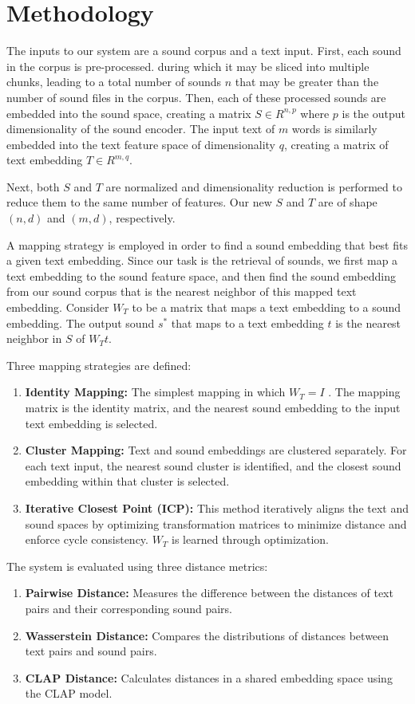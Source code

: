 \documentclass[twoside,a4paper]{article}
\begin{document}
\section{Methodology}\label{sec:methodology}
The inputs to our system are a sound corpus and a text input. First, each sound in the corpus is pre-processed. during which it may be sliced into multiple chunks, leading to a total number of sounds $n$ that may be greater than the number of sound files in the corpus. Then, each of these processed sounds are embedded into the sound space, creating a matrix $S \in R^{n, p}$ where $p$ is the output dimensionality of the sound encoder. The input text of $m$ words is similarly embedded into the text feature space of dimensionality $q$, creating a matrix of text embedding  $T \in R^{m,q}$.

Next, both $S$ and $T$ are normalized and dimensionality reduction is performed to reduce them to the same number of features. Our new $S$ and $T$ are of shape $(n, d)$ and $(m, d)$, respectively.

A mapping strategy is employed in order to find a sound embedding that best fits a given text embedding. Since our task is the retrieval of sounds, we first map a text embedding to the sound feature space, and then find the sound embedding from our sound corpus that is the nearest neighbor of this mapped text embedding. Consider $W_T$ to be a matrix that maps a text embedding to a sound embedding. The output sound $s^*$ that maps to a text embedding $t$ is the nearest neighbor in $S$ of $W_Tt$.

Three mapping strategies are defined:
\begin{enumerate}
    \item \textbf{Identity Mapping:} The simplest mapping in which $W_T = I$ . The mapping matrix is the identity matrix, and the nearest sound embedding to the input text embedding is selected.
    \item \textbf{Cluster Mapping:} Text and sound embeddings are clustered separately. For each text input, the nearest sound cluster is identified, and the closest sound embedding within that cluster is selected.
    \item \textbf{Iterative Closest Point (ICP):} This method iteratively aligns the text and sound spaces by optimizing transformation matrices to minimize distance and enforce cycle consistency. $W_T$ is learned through optimization. 
\end{enumerate}

The system is evaluated using three distance metrics:
\begin{enumerate}
    \item \textbf{Pairwise Distance:} Measures the difference between the distances of text pairs and their corresponding sound pairs.
    \item \textbf{Wasserstein Distance:} Compares the distributions of distances between text pairs and sound pairs.
    \item \textbf{CLAP Distance:} Calculates distances in a shared embedding space using the CLAP model.
\end{enumerate}
\end{document}
